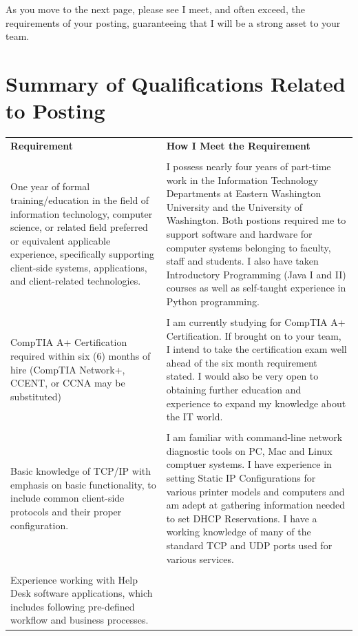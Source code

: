 \documentclass[a4paper,10pt]{article}
\begin{document}
\par
As you move to the next page, please see I meet, and often exceed, the requirements of your posting, guaranteeing that I will be a strong asset to your team.\\
\pagebreak
\section{Summary of Qualifications Related to Posting}
\begin{longtable}{|p{.35\linewidth}|p{.6\linewidth}|}
	\textbf{Requirement} & \textbf{How I Meet the Requirement}\\
	&\\
	One year of formal training/education in the field of information technology, computer science, or related field preferred or equivalent applicable experience, specifically supporting client-side systems, applications, and client-related technologies.
	& I possess nearly four years of part-time work in the Information Technology Departments at Eastern Washington University and the University of Washington. Both postions required me to support software and hardware for computer systems belonging to faculty, staff and students. I also have taken Introductory Programming (Java I and II) courses as well as self-taught experience in Python programming. \\
	&\\
	CompTIA A+ Certification required within six (6) months of hire (CompTIA Network+, CCENT, or CCNA may be substituted)
	& I am currently studying for CompTIA A+ Certification. If brought on to your team, I intend to take the certification exam well ahead of the six month requirement stated. I would also be very open to obtaining further education and experience to expand my knowledge about the IT world.\\
	&\\
	Basic knowledge of TCP/IP with emphasis on basic functionality, to include common client-side protocols and their proper configuration.
	& I am familiar with command-line network diagnostic tools on PC, Mac and Linux comptuer systems. I have experience in setting Static IP Configurations for various printer models and computers and am adept at gathering information needed to set DHCP Reservations. I have a working knowledge of many of the standard TCP and UDP ports used for various services.\\
	&\\
	Experience working with Help Desk software applications, which includes following pre-defined workflow and business processes.

\end{longtable}
\end{document}
